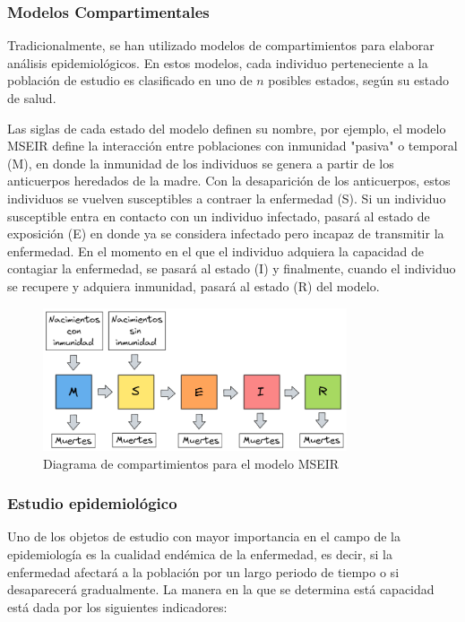 \documentclass{article}
\begin{document}
\subsubsection{Modelos Compartimentales}

Tradicionalmente, se han utilizado modelos de compartimientos para elaborar análisis epidemiológicos. En estos modelos, cada individuo perteneciente a la población de estudio es clasificado en uno de $n$ posibles estados, según su estado de salud.

Las siglas de cada estado del modelo definen su nombre, por ejemplo, el modelo MSEIR define la interacción entre poblaciones con inmunidad "pasiva" o temporal (M), en donde la inmunidad de los individuos se genera a partir de los anticuerpos heredados de la madre. Con la desaparición de los anticuerpos, estos individuos se vuelven susceptibles a contraer la enfermedad (S). Si un individuo susceptible entra en contacto con un individuo infectado, pasará al estado de exposición (E) en donde ya se considera infectado pero incapaz de transmitir la enfermedad. En el momento en el que el individuo adquiera la capacidad de contagiar la enfermedad, se pasará al estado (I) y finalmente, cuando el individuo se recupere y adquiera inmunidad, pasará al estado (R) del modelo.\cite{modelCompartimental}

\begin{figure}[h.]
  \centering
    \includegraphics[width=0.8\textwidth]{Imagenes/MSEIR_compatimientos.PNG}
  \caption{Diagrama de compartimientos para el modelo MSEIR}
  \label{fig:ejemplo}
\end{figure}

\subsubsection{Estudio epidemiológico}
Uno de los objetos de estudio con mayor importancia en el campo de la epidemiología es la cualidad endémica de la enfermedad, es decir, si la enfermedad afectará a la población por un largo periodo de tiempo o si desaparecerá gradualmente. La manera en la que se determina está capacidad está dada por los siguientes indicadores:
\end{document}
